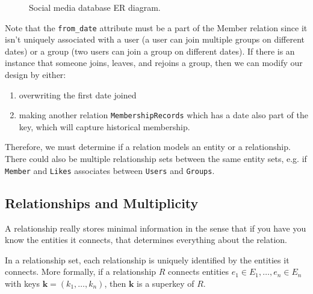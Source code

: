 \begin{example}[E/R Diagram]
\begin{figure}[H]
        \caption{Social media database ER diagram.} 
        \label{fig:social_media}
      \end{figure}

      Note that the \texttt{from\_date} attribute must be a part of the Member relation since it isn't uniquely associated with a user (a user can join multiple groups on different dates) or a group (two users can join a group on different dates). If there is an instance that someone joins, leaves, and rejoins a group, then we can modify our design by either: 
      \begin{enumerate}
        \item overwriting the first date joined 
        \item making another relation \texttt{MembershipRecords} which has a date also part of the key, which will capture historical membership.  
      \end{enumerate}
    \end{example}

    Therefore, we must determine if a relation models an entity or a relationship. There could also be multiple relationship sets between the same entity sets, e.g. if \texttt{Member} and \texttt{Likes} associates between \texttt{Users} and \texttt{Groups}. 

\subsection{Relationships and Multiplicity} 

    A relationship really stores minimal information in the sense that if you have you know the entities it connects, that determines everything about the relation. 

    \begin{theorem}
      In a relationship set, each relationship is uniquely identified by the entities it connects. More formally, if a relationship $R$ connects entities $e_1 \in E_1, \ldots, e_n \in E_n$ with keys $\mathbf{k} = (k_1, \ldots, k_n)$, then $\mathbf{k}$ is a superkey of $R$. 
    \end{theorem}

